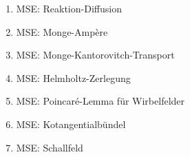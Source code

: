 \begin{frame}[t]
\begin{columns}[t,onlytextwidth]
{\begin{column}{0.48\textwidth}
\begin{enumerate}
\item<24-> MSE: Reaktion-Diffusion
\item<25-> MSE: Monge-Ampère
\item<26-> MSE: Monge-Kantorovitch-Transport
\item<27-> MSE: Helmholtz-Zerlegung
\item<28-> MSE: Poincaré-Lemma für Wirbelfelder
\item<29-> MSE: Kotangentialbündel
\item<30-> MSE: Schallfeld
\end{enumerate}
\end{column}
}
\end{columns}
\end{frame}
\egroup
